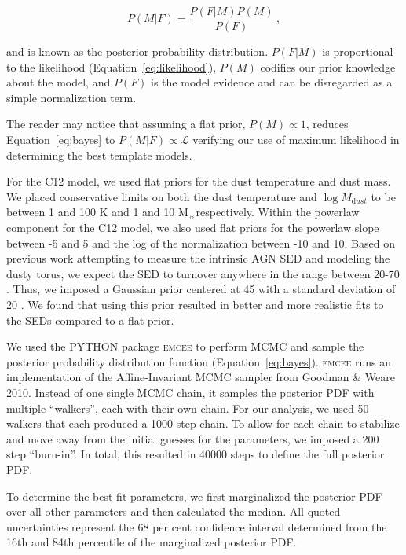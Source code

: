 \documentclass[fleqn, usenatbib]{mnras}
\newcommand{\msun}{M$_{\sun}$}
\begin{document}
\begin{equation}\label{eq:bayes}
P(M|F) = \frac{P(F|M)P(M)}{P(F)}\,,
\end{equation}

\noindent and is known as the posterior probability distribution. $P(F|M)$ is proportional to the likelihood (Equation~\ref{eq:likelihood}), $P(M)$ codifies our prior knowledge about the model, and $P(F)$ is the model evidence and can be disregarded as a simple normalization term. 

The reader may notice that assuming a flat prior, $P(M) \propto 1$, reduces Equation~\ref{eq:bayes} to $P(M|F) \propto \mathcal{L}$ verifying our use of maximum likelihood in determining the best template models.

For the C12 model, we used flat priors for the dust temperature and dust mass. We placed conservative limits on both the dust temperature and $\log M_{\mathrm dust}$ to be between 1 and 100 K and 1 and 10 \msun respectively. Within the powerlaw component for the C12 model, we also used flat priors for the powerlaw slope between -5 and 5 and the log of the normalization between -10 and 10. Based on previous work attempting to measure the intrinsic AGN SED and modeling the dusty torus, we expect the SED to turnover anywhere in the range between 20-70 \micron. Thus, we imposed a Gaussian prior centered at 45 \micron{} with a standard deviation of 20 \micron. We found that using this prior resulted in better and more realistic fits to the SEDs {\color{red}compared to a flat prior.}

We used the \textsc{PYTHON} package \textsc{emcee} \citep{Foreman-Mackey:2013lr} to perform MCMC and sample the posterior probability distribution function (Equation~\ref{eq:bayes}). \textsc{emcee} runs an implementation of the Affine-Invariant MCMC sampler from Goodman \& Weare 2010. Instead of one single MCMC chain, it samples the posterior PDF with multiple ``walkers'', each with their own chain. For our analysis, we used 50 walkers that each produced a 1000 step chain. To allow for each chain to stabilize and move away from the initial guesses for the parameters, we imposed a 200 step ``burn-in''. In total, this resulted in 40000 steps to define the full posterior PDF. 

To determine the best fit parameters, we first marginalized the posterior PDF over all other parameters and then calculated the median. All quoted uncertainties represent the 68 per cent confidence interval determined from the 16th and 84th percentile of the marginalized posterior PDF.
\end{document}
